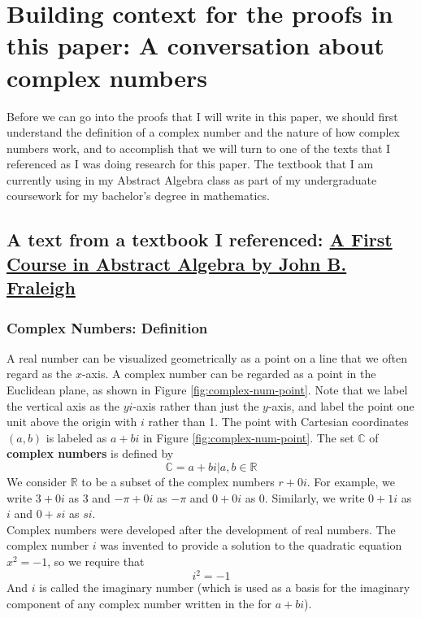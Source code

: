 \documentclass{turabian-researchpaper}
\begin{document}
\section{Building context for the proofs in this paper: A conversation about complex numbers}
Before we can go into the proofs that I will write in this paper, we should first understand the definition of a complex number and the nature of how complex numbers work, and to accomplish that we will turn to one of the texts that I referenced as I was doing research for this paper. The textbook that I am currently using in my Abstract Algebra class as part of my undergraduate coursework for my bachelor's degree in mathematics.  

\subsection{A text from a textbook I referenced: \href{https://www.amazon.com/First-Course-Abstract-Algebra-7th/dp/0201763907/ref=tmm_hrd_swatch_0?_encoding=UTF8&qid=&sr=}{A First Course in Abstract Algebra by John B. Fraleigh}}  

\subsubsection{Complex Numbers: Definition}\cite[p.$\Tilde{12}$]{Fraleigh2003} 

A real number can be visualized geometrically as a point on a line that we often regard as the \(x\)-axis. A complex number can be regarded as a point in the Euclidean plane, as shown in Figure \ref{fig:complex-num-point}. Note that we label the vertical axis as the \(yi\)-axis rather than just the \(y\)-axis, and label the point one unit above the origin with \(i\) rather than 1. The point with Cartesian coordinates \((a,b)\) is labeled as \(a + bi\) in Figure \ref{fig:complex-num-point}. The set $\mathds{C}$ of \textbf{complex numbers} is defined by \[\mathds{C} = a + bi | a,b \in \mathds{R}\] We consider $\mathds{R}$ to be a subset of the complex numbers \(r + 0i\). For example, we write \(3 + 0i\) as \(3\) and \(-\pi + 0i\) as \(-\pi\) and \(0 + 0i\) as \(0\). Similarly, we write \(0 + 1i\) as \(i\) and \(0 + si\) as \(si\).  \\ Complex numbers were developed after the development of real numbers. The complex number \(i\) was invented to provide a solution to the quadratic equation \(x^2 = -1\), so we require that \[i^2 = -1\] And \(i\) is called the imaginary number (which is used as a basis for the imaginary component of any complex number written in the for \(a + bi\)).   
\end{document}
